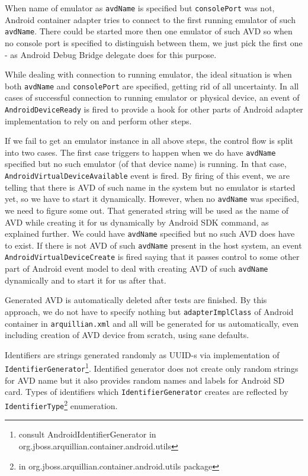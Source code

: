 \documentclass[12pt,final,oneside]{fithesis}
\begin{document}
When name of emulator as \texttt{avdName} is specified but \texttt{consolePort} was not, Android container adapter tries to connect to the first running emulator of such \texttt{avdName}. There could be started more then one emulator of such AVD so when no console port is specified to distinguish between them, we just pick the first one - as Android Debug Bridge delegate does for this purpose.

While dealing with connection to running emulator, the ideal situation is when both \texttt{avdName} and \texttt{consolePort} are specified, getting rid of all uncertainty. In all cases of successful connection to running emulator or physical device, an event of \texttt{AndroidDeviceReady} is fired to provide a hook for other parts of Android adapter implementation to rely on and perform other steps.

If we fail to get an emulator instance in all above steps, the control flow is split into two cases. The first case triggers to happen when we do have \texttt{avdName} specified but no such emulator (of that device name) is running. In that case, \texttt{AndroidVirtualDeviceAvailable} event is fired. By firing of this event, we are telling that there is AVD of such name in the system but no emulator is started yet, so we have to start it dynamically. However, when no \texttt{avdName} was specified, we need to figure some out. That generated string will be used as the name of AVD while creating it for us dynamically by Android SDK command, as explained further. We could have \texttt{avdName} specified but no such AVD does have to exist. If there is not AVD of such \texttt{avdName} present in the host system, an event \texttt{AndroidVirtualDeviceCreate} is fired saying that it passes control to some other part of Android event model to deal with creating AVD of such \texttt{avdName} dynamically and to start it for us after that.

Generated AVD is automatically deleted after tests are finished. By this approach, we do not have to specify nothing but \texttt{adapterImplClass} of Android container in \texttt{arquillian.xml} and all will be generated for us automatically, even including creation of AVD device from scratch, using sane defaults.

Identifiers are strings generated randomly as UUID-s via implementation of \texttt{IdentifierGenerator}\footnote{consult AndroidIdentifierGenerator in org.jboss.arquillian.container.android.utils}. Identified generator does not create only random strings for AVD name but it also provides random names and labels for Android SD card. Types of identifiers which \texttt{IdentifierGenerator} creates are reflected by \texttt{IdentifierType}\footnote{in org.jboss.arquillian.container.android.utils package} enumeration.
\end{document}
